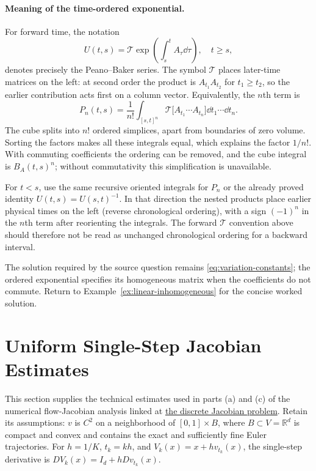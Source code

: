 \documentclass[12pt,a4paper,oneside]{book}
\begin{document}
\paragraph{Meaning of the time-ordered exponential.}
For forward time, the notation
\begin{equation*}
U(t,s)=\mathcal T\exp\left(\int_s^t A_\tau\dd\tau\right),\quad t\ge s,
\end{equation*}
denotes precisely the Peano--Baker series. The symbol $\mathcal T$
places later-time matrices on the left: at second order the product
is $A_{t_1}A_{t_2}$ for $t_1\ge t_2$, so the earlier contribution
acts first on a column vector. Equivalently, the $n$th term is
\begin{equation*}
P_n(t,s)=\frac1{n!}\int_{[s,t]^n}
 \mathcal T\bigl[A_{t_1}\cdots A_{t_n}\bigr]
 \dd t_1\cdots\dd t_n.
\end{equation*}
The cube splits into $n!$ ordered simplices, apart from boundaries
of zero volume. Sorting the factors makes all these integrals equal,
which explains the factor $1/n!$. With commuting coefficients the
ordering can be removed, and the cube integral is $B_A(t,s)^n$;
without commutativity this simplification is unavailable.

For $t<s$, use the same recursive oriented integrals for $P_n$
or the already proved identity $U(t,s)=U(s,t)^{-1}$.
In that direction the nested products place earlier physical times
on the left (reverse chronological ordering), with a sign $(-1)^n$
in the $n$th term after reorienting the integrals. The forward
$\mathcal T$ convention above should therefore not be read as
unchanged chronological ordering for a backward interval.

The solution required by the source question remains
\eqref{eq:variation-constants}; the ordered exponential specifies
its homogeneous matrix when the coefficients do not commute.
Return to Example~\ref{ex:linear-inhomogeneous} for the concise worked solution.

\clearpage
\section{Uniform Single-Step Jacobian Estimates}
\label{app:euler-jacobian-estimates}
This section supplies the technical estimates used in parts (a) and (c) of the numerical flow-Jacobian analysis
linked at \hyperref[src:p9q4discrete]{the discrete Jacobian problem}.
Retain its assumptions: $v$ is $C^2$ on a neighborhood of $[0,1]\times B$, where $B\subset V=\mathbb R^d$
is compact and convex and contains the exact and sufficiently fine Euler trajectories.
For $h=1/K$, $t_k=kh$, and $V_k(x)=x+hv_{t_k}(x)$, the single-step derivative is
$DV_k(x)=I_d+hDv_{t_k}(x)$.
\end{document}
